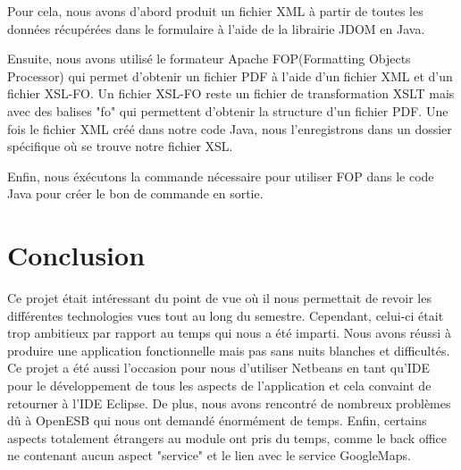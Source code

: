 \documentclass[11pt,a4paper]{article}
\begin{document}
Pour cela, nous avons d'abord produit un fichier XML à partir de toutes les
données récupérées dans le formulaire à l'aide de la librairie JDOM en
Java. 

Ensuite, nous avons utilisé le formateur Apache FOP(Formatting Objects
Processor) qui permet d'obtenir un fichier PDF à l'aide d'un fichier XML et d'un
fichier XSL-FO. Un fichier XSL-FO reste un fichier de transformation XSLT mais
avec des balises "fo" qui permettent d'obtenir la structure d'un fichier PDF.
Une fois le fichier XML créé dans notre code Java, nous l'enregistrons dans un
dossier spécifique où se trouve notre fichier XSL.


Enfin, nous éxécutons la commande nécessaire pour utiliser FOP dans le code Java
pour créer le bon de commande en sortie.




\section{Conclusion}

Ce projet était intéressant du point de vue où il nous permettait de revoir les
différentes technologies vues tout au long du semestre. Cependant, celui-ci
était trop ambitieux par rapport au temps qui nous a été imparti. Nous avons
réussi à produire une application fonctionnelle mais pas sans nuits blanches et
difficultés. Ce projet a été aussi l'occasion pour nous d'utiliser Netbeans en
tant qu'IDE pour le développement de tous les aspects de l'application et cela
convaint de retourner à l'IDE Eclipse. De plus, nous avons rencontré de
nombreux problèmes dû à OpenESB qui nous ont demandé énormément de temps.
Enfin, certains aspects totalement étrangers au module ont pris du temps, comme
le back office ne contenant aucun aspect "service" et le lien avec le service
GoogleMaps.
\end{document}
